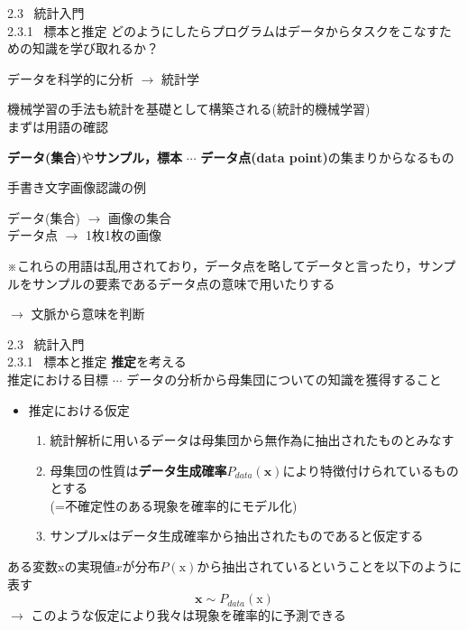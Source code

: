 \documentclass[dvipdfmx,8pt]{beamer}
\begin{document}
  \begin{frame}{2.3 \ 統計入門 \\ \normalsize{2.3.1 \ 標本と推定}}
    どのようにしたらプログラムはデータからタスクをこなすための知識を学び取れるか？\\
    \begin{center}
      データを科学的に分析 $\rightarrow$ 統計学
    \end{center}
    機械学習の手法も統計を基礎として構築される(統計的機械学習)\\
    まずは用語の確認\\
    \begin{center}
      \textbf{データ(集合)}や\textbf{サンプル，標本} $\cdots$ \textbf{データ点(data point)}の集まりからなるもの\\
    \end{center}
    \begin{exampleblock}{手書き文字画像認識の例}
      \begin{center}
        データ(集合) $\rightarrow$ 画像の集合\\
        データ点 $\rightarrow$ 1枚1枚の画像
      \end{center}
    \end{exampleblock}
    \vspace{0.2cm}
    ※これらの用語は乱用されており，データ点を略してデータと言ったり，サンプルをサンプルの要素であるデータ点の意味で用いたりする\\
    \begin{center}
      $\rightarrow$ 文脈から意味を判断
    \end{center}
  \end{frame}

  \begin{frame}[t]{2.3 \ 統計入門 \\ \normalsize{2.3.1 \ 標本と推定}}
    \textbf{推定}を考える\\
    推定における目標 $\cdots$ データの分析から母集団についての知識を獲得すること
    \begin{itemize}
      \item 推定における仮定
      \begin{enumerate}
        \item 統計解析に用いるデータは母集団から無作為に抽出されたものとみなす 
        \item 母集団の性質は\textbf{データ生成確率}$P_{data}(\bm{x})$により特徴付けられているものとする\\
        (=不確定性のある現象を確率的にモデル化)
        \item サンプル$\bm{x}$はデータ生成確率から抽出されたものであると仮定する
      \end{enumerate}
    \end{itemize}
    ある変数$\mathrm{x}$の実現値$x$が分布$P(\mathrm{x})$から抽出されているということを以下のように表す
    \begin{equation*}
      \bm{x} \sim P_{data}(\bm{\mathrm{x}})
    \end{equation*}
    $\rightarrow$ このような仮定により我々は現象を確率的に予測できる
  \end{frame}
\end{document}
